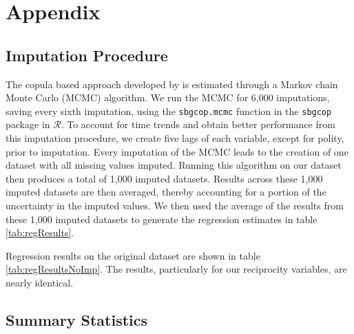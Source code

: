\newpage
\section*{Appendix}
\label{appendix}

\subsection*{Imputation Procedure}

The copula based approach developed by \citet{hoff:2007} is estimated through a Markov chain Monte Carlo (MCMC) algorithm. We run the MCMC for 6,000 imputations, saving every sixth imputation, using the \texttt{sbgcop.mcmc} function in the \texttt{sbgcop} package in $\mathcal{R}$. To account for time trends and obtain better performance from this imputation procedure, we create five lags of each variable, except for polity, prior to imputation. Every imputation of the MCMC leads to the creation of one dataset with all missing values imputed. Running this algorithm on our dataset then produces a total of 1,000 imputed datasets. Results across these 1,000 imputed datasets are then averaged, thereby accounting for a portion of the uncertainty in the imputed values. We then used the average of the results from these 1,000 imputed datasets to generate the regression estimates in table \ref{tab:regResults}. 

Regression results on the original dataset are shown in table \ref{tab:regResultsNoImp}. The results, particularly for our reciprocity variables, are nearly identical. 


\FloatBarrier

\subsection*{Summary Statistics}


\FloatBarrier


\FloatBarrier

\newpage